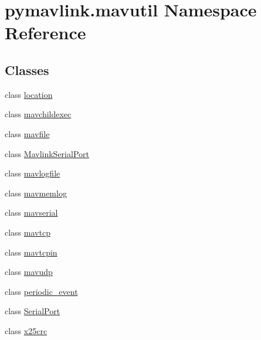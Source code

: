 \hypertarget{namespacepymavlink_1_1mavutil}{}\section{pymavlink.\+mavutil Namespace Reference}
\label{namespacepymavlink_1_1mavutil}
\subsection*{Classes}
\begin{DoxyCompactItemize}
\item 
class \mbox{\hyperlink{classpymavlink_1_1mavutil_1_1location}{location}}
\item 
class \mbox{\hyperlink{classpymavlink_1_1mavutil_1_1mavchildexec}{mavchildexec}}
\item 
class \mbox{\hyperlink{classpymavlink_1_1mavutil_1_1mavfile}{mavfile}}
\item 
class \mbox{\hyperlink{classpymavlink_1_1mavutil_1_1MavlinkSerialPort}{Mavlink\+Serial\+Port}}
\item 
class \mbox{\hyperlink{classpymavlink_1_1mavutil_1_1mavlogfile}{mavlogfile}}
\item 
class \mbox{\hyperlink{classpymavlink_1_1mavutil_1_1mavmemlog}{mavmemlog}}
\item 
class \mbox{\hyperlink{classpymavlink_1_1mavutil_1_1mavserial}{mavserial}}
\item 
class \mbox{\hyperlink{classpymavlink_1_1mavutil_1_1mavtcp}{mavtcp}}
\item 
class \mbox{\hyperlink{classpymavlink_1_1mavutil_1_1mavtcpin}{mavtcpin}}
\item 
class \mbox{\hyperlink{classpymavlink_1_1mavutil_1_1mavudp}{mavudp}}
\item 
class \mbox{\hyperlink{classpymavlink_1_1mavutil_1_1periodic__event}{periodic\+\_\+event}}
\item 
class \mbox{\hyperlink{classpymavlink_1_1mavutil_1_1SerialPort}{Serial\+Port}}
\item 
class \mbox{\hyperlink{classpymavlink_1_1mavutil_1_1x25crc}{x25crc}}
\end{DoxyCompactItemize}

